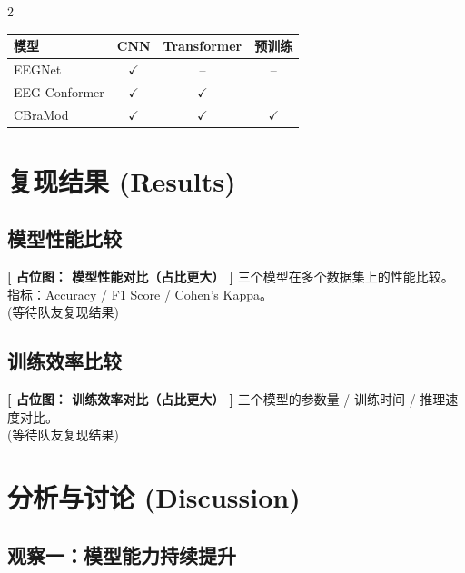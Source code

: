 \documentclass[12pt, a0paper]{article}
\renewcommand{\Large}{\fontsize{34}{42}\selectfont}
\renewcommand{\small}{\fontsize{18}{24}\selectfont}
\newcommand{\placeholderh}[3]{%
    \begin{center}
    \colorbox{mygray!12}{\parbox{0.9\columnwidth}{%
        \centering
        \vspace{1.2em}
        {\Large\bfseries\color{mygray} [ 占位图： #1 ]}
        \vspace{0.8em}
        {\small\color{mygray} #2}
        \vspace{#3}
    }}
    \end{center}
}
\begin{document}
\begin{multicols}{2}
\begin{center}
\begin{tabular}{lccc}
    \toprule
    \textbf{模型} & \textbf{CNN} & \textbf{Transformer} & \textbf{预训练} \\
    \midrule
    EEGNet        & $\checkmark$ & -- & -- \\
    EEG Conformer & $\checkmark$ & $\checkmark$ & -- \\
    CBraMod       & $\checkmark$ & $\checkmark$ & $\checkmark$ \\
    \bottomrule
\end{tabular}
\end{center}

\section{复现结果 (Results)}

\subsection{模型性能比较}

\placeholderh{模型性能对比（占比更大）}{%
    三个模型在多个数据集上的性能比较。\\
    指标：Accuracy / F1 Score / Cohen's Kappa。\\
    \small (等待队友复现结果)}{6.0cm}

\subsection{训练效率比较}

\placeholderh{训练效率对比（占比更大）}{%
    三个模型的参数量 / 训练时间 / 推理速度对比。\\
    \small (等待队友复现结果)}{4.8cm}



\section{分析与讨论 (Discussion)}

\subsection{观察一：模型能力持续提升}


\end{multicols}
\end{document}
